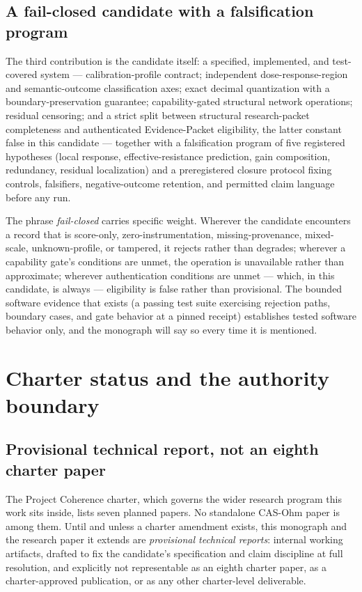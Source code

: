\subsection{A fail-closed candidate with a falsification program}\label{ch01:contrib:candidate}

The third contribution is the candidate itself: a specified, implemented, and test-covered system --- calibration-profile contract; independent dose-response-region and semantic-outcome classification axes; exact decimal quantization with a boundary-preservation guarantee; capability-gated structural network operations; residual censoring; and a strict split between structural research-packet completeness and authenticated Evidence-Packet eligibility, the latter constant false in this candidate --- together with a falsification program of five registered hypotheses (local response, effective-resistance prediction, gain composition, redundancy, residual localization) and a preregistered closure protocol fixing controls, falsifiers, negative-outcome retention, and permitted claim language before any run.

The phrase \emph{fail-closed} carries specific weight. Wherever the candidate encounters a record that is score-only, zero-instrumentation, missing-provenance, mixed-scale, unknown-profile, or tampered, it rejects rather than degrades; wherever a capability gate's conditions are unmet, the operation is unavailable rather than approximate; wherever authentication conditions are unmet --- which, in this candidate, is always --- eligibility is false rather than provisional. The bounded software evidence that exists (a passing test suite exercising rejection paths, boundary cases, and gate behavior at a pinned receipt) establishes tested software behavior only, and the monograph will say so every time it is mentioned.

\section{Charter status and the authority boundary}\label{ch01:charter}

\subsection{Provisional technical report, not an eighth charter paper}\label{ch01:charter:status}

The Project Coherence charter, which governs the wider research program this work sits inside, lists seven planned papers. No standalone CAS-Ohm paper is among them. Until and unless a charter amendment exists, this monograph and the research paper it extends are \emph{provisional technical reports}: internal working artifacts, drafted to fix the candidate's specification and claim discipline at full resolution, and explicitly not representable as an eighth charter paper, as a charter-approved publication, or as any other charter-level deliverable.

